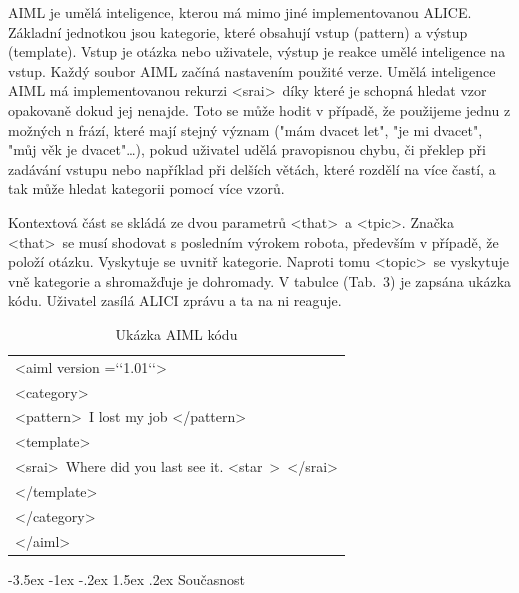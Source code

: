 \documentclass[a4paper,10pt]{article}
\makeatletter
\theoremstyle{definition}
\renewcommand\section{\@startsection {section}{1}{\z@}%
                                   {-3.5ex \@plus -1ex \@minus -.2ex}%
                                   {1.5ex \@plus.2ex}%
                                   {\large\bfseries}}
\makeatother
\begin{document}
AIML je umělá inteligence, kterou má mimo jiné implementovanou ALICE. Základní jednotkou jsou kategorie, které obsahují vstup (pattern) a výstup (template). Vstup je otázka nebo uživatele, výstup je reakce umělé inteligence na vstup. Každý soubor AIML začíná nastavením použité verze. 
Umělá inteligence AIML má implementovanou rekurzi \textless srai\textgreater\ díky které je schopná hledat vzor opakovaně dokud jej nenajde. Toto se může hodit v případě, že použijeme jednu z možných n frází, které mají stejný význam ("mám dvacet let", "je mi dvacet", "můj věk je dvacet"…), pokud uživatel udělá pravopisnou chybu, či překlep při zadávání vstupu nebo například při delších větách, které rozdělí na více častí, a tak může hledat kategorii pomocí více vzorů. \cite{8}\cite{5}\cite{b}

Kontextová část se skládá ze dvou parametrů \textless that\textgreater\ a \textless tpic\textgreater. Značka \textless that\textgreater\ se musí shodovat s posledním výrokem robota, především v případě, že položí otázku. Vyskytuje se uvnitř kategorie. Naproti tomu \textless topic\textgreater\ se vyskytuje vně kategorie a shromažďuje je dohromady. V tabulce (Tab.~3) je zapsána ukázka kódu. Uživatel zasílá ALICI zprávu a ta na ni reaguje.


\begin{table}[h] 
\begin{center}

\label{tab:1}
\begin{tabular}{l}
\hline\noalign{\smallskip}
\textless aiml version =‘‘1.01‘‘\textgreater\\
\textless category\textgreater\\
\textless pattern\textgreater\ I lost my job \textless /pattern\textgreater\\
\textless template\textgreater\\
\textless srai\textgreater\ Where did you last see it. \textless star\ \textgreater\ \textless /srai\textgreater\\
\textless /template\textgreater\\
\textless /category\textgreater \\
\textless /aiml\textgreater\\
\hline
\end{tabular}
\caption{Ukázka AIML kódu} 
\end{center}
\end{table}

\section{Současnost}
\label{sec:5}
\end{document}
